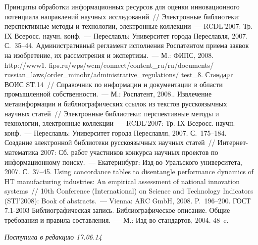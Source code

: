 \begin{multicols}{2}
{{\begin{thebibliography}{99}
 Принципы обработки
информационных ресурсов для оценки инновационного потенциала
направлений научных исследований~// Электронные библиотеки:
перспективные методы и технологии, электронные коллекции~---
RCDL'2007: Тр. IX Всеросс. научн. конф.~--- Переславль: Университет
города Переславля, 2007. С.~35--44.
Административный регламент исполнения Роспатентом приема заявок на
изобретение, их рас\-смот\-ре\-ния и экспертизы.~--- М.: ФИПС, 2008. {\sf
http://www1. fips.ru/wps/wcm/connect/content\_ru/ru/documents/ russian\_laws/order\_minobr/administrative\_regulations/ test\_8}.
Стандарт ВОИС ST.14~// Справочник по информации и документации в области
промышленной собственности.~--- М.: Роспатент, 2008..
 Извлечение
метаинформации и библиографических ссылок из текстов русскоязычных
научных статей~// Электронные библиотеки: перспективные методы и
технологии, электронные коллекции~--- RCDL'2007: Тр. IX Всеросс. научн.
конф.~--- Переславль: Университет города Переславля, 2007. С.~175--184.
 Создание электронной
библиотеки русскоязычных научных статей~// Ин\-тер\-нет-ма\-те\-ма\-ти\-ка
2007: Сб. работ участников конкурса научных проектов по
информационному поиску.~--- Екатеринбург: Изд-во Уральского университета,
2007. С.~37--45.
 Using concordance tables to
disentangle performance dynamics of HT manufacturing industries: An empirical
assessment of national innovation systems~// 10th Conference (International) on
Science and Technology Indicators (STI'2008): Book of abstracts.~---
Vienna: ARC GmbH, 2008. P.~196--200.
ГОСТ 7.1-2003 Библиографическая запись. Библиографическое описание. Общие
требования и правила составления.~--- М.: Изд-во стандартов, 2004. 48~c.



\end{thebibliography}
} }

\end{multicols}

\vspace*{-6pt}

\hfill{\small\textit{Поступила в редакцию 17.06.14}}

